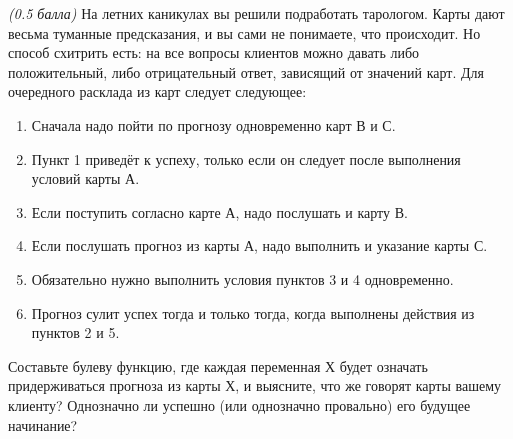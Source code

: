 \question
\textit{(0.5 балла)} На летних каникулах вы решили подработать тарологом. Карты дают весьма туманные предсказания, и вы сами не понимаете, что происходит. Но способ схитрить есть: на все вопросы клиентов можно давать либо положительный, либо отрицательный ответ, зависящий от значений карт. Для очередного расклада из карт следует следующее:

\begin{enumerate}
\item Сначала надо пойти по прогнозу одновременно карт В и С.
\item Пункт 1 приведёт к успеху, только если он следует после выполнения условий карты А.
\item Если поступить согласно карте А, надо послушать и карту В.
\item Если послушать прогноз из карты А, надо выполнить и указание карты С.
\item Обязательно нужно выполнить условия пунктов 3 и 4 одновременно.
\item Прогноз сулит успех тогда и только тогда, когда выполнены действия из пунктов 2 и 5.
\end{enumerate}

Составьте булеву функцию, где каждая переменная Х будет означать \flqq придерживаться прогноза из карты Х\frqq, и выясните, что же говорят карты вашему клиенту? Однозначно ли успешно (или однозначно провально) его будущее начинание?